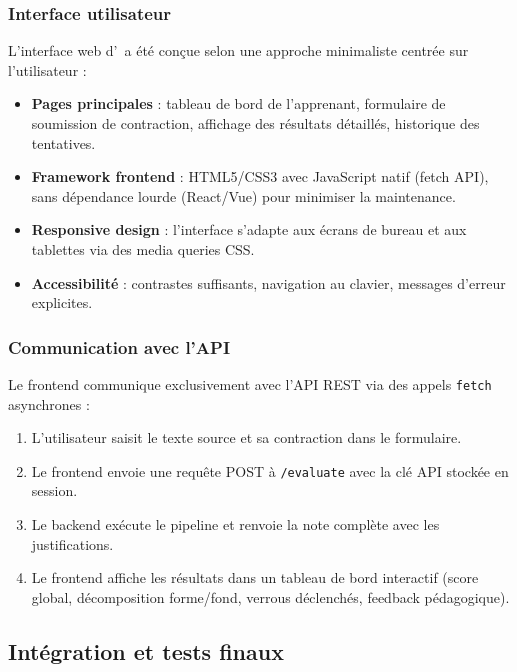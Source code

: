 \subsubsection{Interface utilisateur}

L'interface web d'\AZIZA\ a été conçue selon une approche minimaliste centrée sur l'utilisateur :

\begin{itemize}
    \item \textbf{Pages principales} : tableau de bord de l'apprenant, formulaire de soumission de contraction, affichage des résultats détaillés, historique des tentatives.
    \item \textbf{Framework frontend} : HTML5/CSS3 avec JavaScript natif (fetch API), sans dépendance lourde (React/Vue) pour minimiser la maintenance.
    \item \textbf{Responsive design} : l'interface s'adapte aux écrans de bureau et aux tablettes via des media queries CSS.
    \item \textbf{Accessibilité} : contrastes suffisants, navigation au clavier, messages d'erreur explicites.
\end{itemize}

\subsubsection{Communication avec l'API}

Le frontend communique exclusivement avec l'API REST via des appels \texttt{fetch} asynchrones :

\begin{enumerate}
    \item L'utilisateur saisit le texte source et sa contraction dans le formulaire.
    \item Le frontend envoie une requête POST à \texttt{/evaluate} avec la clé API stockée en session.
    \item Le backend exécute le pipeline et renvoie la note complète avec les justifications.
    \item Le frontend affiche les résultats dans un tableau de bord interactif (score global, décomposition forme/fond, verrous déclenchés, feedback pédagogique).
\end{enumerate}

\subsection{Intégration et tests finaux}

